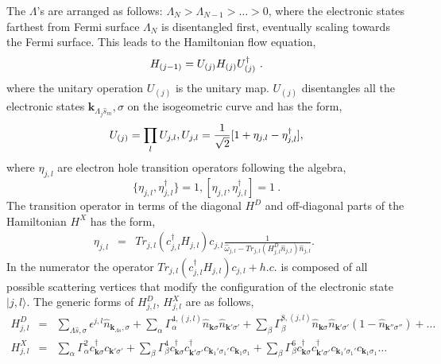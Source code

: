 \documentclass[aps,prx,preprint,groupedaddress]{revtex4-2}
\begin{document}
The $\Lambda$'s are arranged as follows: $\Lambda_{N}>\Lambda_{N-1}>\ldots>0$, where the electronic states farthest from Fermi surface $\Lambda_{N}$ is disentangled first, eventually scaling towards the Fermi surface. This leads to the Hamiltonian flow equation,
\begin{equation}
\centering
H_{(j-1)}=U_{(j)}H_{(j)}U^{\dagger}_{(j)}~.
\end{equation}
where the unitary operation $U_{(j)}$ is the unitary map. $U_{(j)}$ disentangles all the electronic states $\mathbf{k}_{\Lambda_{j}\hat{s}_{m}},\sigma$ on the isogeometric curve and has the form\cite{anirbanmotti},
\begin{equation}
\centering U_{(j)}=\prod_{l}U_{j,l}, U_{j,l}=\frac{1}{\sqrt{2}}[1+\eta_{j,l}-\eta^{\dagger}_{j,l}],
\end{equation}
where $\eta_{j,l}$ are electron hole transition operators following the algebra,
\begin{equation}
\lbrace\eta_{j,l},\eta_{j,l}^{\dagger}\rbrace=1, \left[\eta_{j,l},\eta_{j,l}^{\dagger}\right]=1~.
\end{equation}
The transition operator in terms of the diagonal $H^{D}$ and off-diagonal parts of the Hamiltonian $H^{X}$ has the form,  
\begin{eqnarray}
\eta_{j,l}&=&Tr_{j,l}(c^{\dagger}_{j,l}H_{j,l})c_{j,l}\frac{1}{\hat{\omega}_{j,l}-Tr_{j,l}(H_{j,l}^{D}\hat{n}_{j,l})\hat{n}_{j,l}}.~~\label{e-TransOp}
\end{eqnarray}
In the numerator the operator $Tr_{j,l}(c^{\dagger}_{j,l}H_{j,l})c_{j,l}+h.c.$ is composed of all possible scattering vertices that modify the configuration of the electronic state $|j,l\rangle$. The generic forms of $H^{D}_{j,l}$, $H^{X}_{j,l}$ are as follows,
\begin{eqnarray}
H^{D}_{j,l}&=&\sum_{\Lambda\hat{s},\sigma}\epsilon^{j,l}\hat{n}_{\mathbf{k}_{\Lambda\hat{s}},\sigma}+\sum_{\alpha}\Gamma_{\alpha}^{4,(j,l)}\hat{n}_{\mathbf{k}\sigma}\hat{n}_{\mathbf{k}'\sigma'}+\sum_{\beta}\Gamma_{\beta}^{8,(j,l)}\hat{n}_{\mathbf{k}\sigma}\hat{n}_{\mathbf{k}'\sigma'}(1-\hat{n}_{\mathbf{k}''\sigma''})+\ldots\nonumber\\
H^{X}_{j,l}&=&\sum_{\alpha}\Gamma_{\alpha}^{2}c^{\dagger}_{\mathbf{k}\sigma}c_{\mathbf{k}'\sigma'}+\sum_{\beta}\Gamma_{\beta}^{4}c^{\dagger}_{\mathbf{k}\sigma}c^{\dagger}_{\mathbf{k}'\sigma'}c_{\mathbf{k}_{1}'\sigma_{1}'}c_{\mathbf{k}_{1}\sigma_{1}}+\sum_{\beta}\Gamma_{\beta}^{6}c^{\dagger}_{\mathbf{k}\sigma}c^{\dagger}_{\mathbf{k}'\sigma'}c_{\mathbf{k}_{1}'\sigma_{1}'}c_{\mathbf{k}_{1}\sigma_{1}}\ldots~~~
\end{eqnarray}
\end{document}
